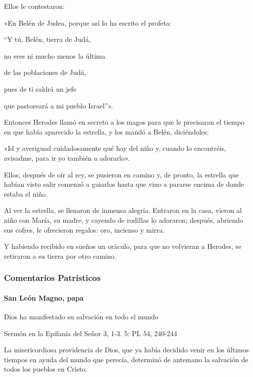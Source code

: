 \documentclass[]{article}
\let\oldparagraph\paragraph
\renewcommand{\paragraph}[1]{\oldparagraph{#1}\mbox{}}
\begin{document}
Ellos le contestaron:

«En Belén de Judea, porque así lo ha escrito el profeta:

``Y tú, Belén, tierra de Judá,

no eres ni mucho menos la última

de las poblaciones de Judá,

pues de ti saldrá un jefe

que pastoreará a mi pueblo Israel''».

Entonces Herodes llamó en secreto a los magos para que le precisaran el
tiempo en que había aparecido la estrella, y los mandó a Belén,
diciéndoles:

«Id y averiguad cuidadosamente qué hay del niño y, cuando lo encontréis,
avisadme, para ir yo también a adorarlo».

Ellos, después de oír al rey, se pusieron en camino y, de pronto, la
estrella que habían visto salir comenzó a guiarlos hasta que vino a
pararse encima de donde estaba el niño.

Al ver la estrella, se llenaron de inmensa alegría. Entraron en la casa,
vieron al niño con María, su madre, y cayendo de rodillas lo adoraron;
después, abriendo sus cofres, le ofrecieron regalos: oro, incienso y
mirra.

Y habiendo recibido en sueños un oráculo, para que no volvieran a
Herodes, se retiraron a su tierra por otro
camino.\protect\hypertarget{_Toc448662861}{}{\protect\hypertarget{_Toc448690380}{}{\protect\hypertarget{_Toc448708403}{}{\protect\hypertarget{_Toc448709489}{}{\protect\hypertarget{_Toc449554491}{}{}}}}}

\subsubsection{Comentarios
Patrísticos}\label{comentarios-patruxedsticos}

\paragraph{San León Magno, papa}\label{san-leuxf3n-magno-papa-2}

Dios ha manifestado su salvación en todo el mundo

Sermón en la Epifanía del Señor 3, 1-3. 5: PL 54, 240-244

La misericordiosa providencia de Dios, que ya había decidido venir en
los últimos tiempos en ayuda del mundo que perecía, determinó de
antemano la salvación de todos los pueblos en Cristo.
\end{document}
